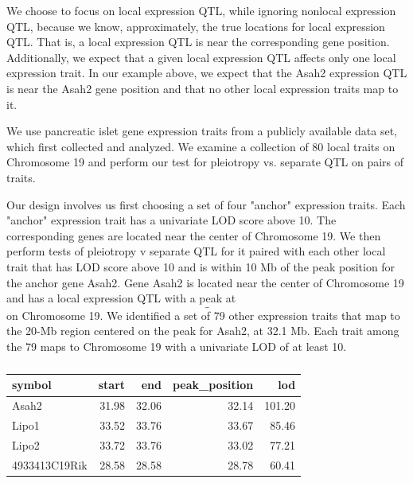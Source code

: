 \documentclass{article}
\begin{document}
We choose to focus on local expression QTL, while ignoring nonlocal expression QTL, because we know, approximately, the true locations for local expression QTL. That is, a local expression QTL is near the corresponding gene position. Additionally, we expect that a given local expression QTL affects only one local expression trait. In our example above, we expect that the Asah2 expression QTL is near the Asah2 gene position and that no other local expression traits map to it.

We use pancreatic islet gene expression traits from a publicly available data set, which \citet{keller2018genetic} first collected and analyzed. We examine a collection of 80 local traits on Chromosome 19 and perform our test for pleiotropy vs. separate QTL on pairs of traits. 

Our design involves us first choosing a set of four "anchor" expression traits. Each "anchor" expression trait has a univariate LOD score above 10. The corresponding genes are located near the center of Chromosome 19. We then perform tests of pleiotropy v separate QTL for it paired with each other local trait that has LOD score above 10 and is within 10 Mb of the peak position for the anchor gene Asah2.
Gene Asah2 is located near the center of Chromosome 19 and has a local expression QTL with a peak at $$\_$$  on Chromosome 19. We identified a set of 79 other expression traits that map to the 20-Mb region centered on the peak for Asah2, at 32.1 Mb. Each trait among the 79 maps to Chromosome 19 with a univariate LOD of at least 10. 


\begin{table}[ht]
\centering
\begin{tabular}{lrrrr}
  \hline
symbol & start & end & peak\_position & lod \\ 
  \hline
Asah2 & 31.98 & 32.06 & 32.14 & 101.20 \\ 
  Lipo1 & 33.52 & 33.76 & 33.67 & 85.46 \\ 
  Lipo2 & 33.72 & 33.76 & 33.02 & 77.21 \\ 
  4933413C19Rik & 28.58 & 28.58 & 28.78 & 60.41 \\ 
   \hline
\end{tabular}
\caption{}\label{tab:ann4}
\end{table}
\end{document}
